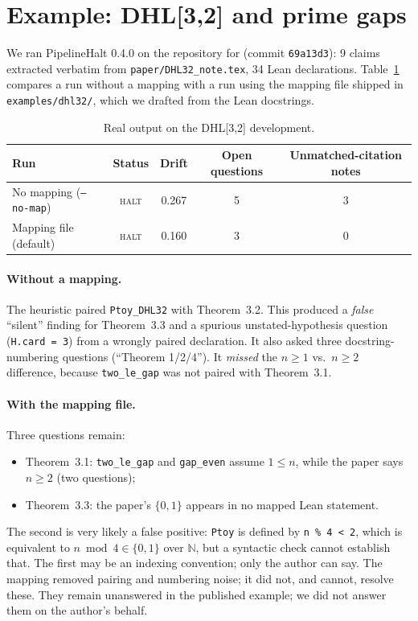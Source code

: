 \documentclass[11pt]{article}
\begin{document}
\section{Example: DHL[3,2] and prime gaps}
We ran PipelineHalt 0.4.0 on the repository for \cite{frohman2026dhl} (commit \texttt{69a13d3}): 9 claims extracted verbatim from \texttt{paper/DHL32\_note.tex}, 34 Lean declarations. Table~\ref{tab:runs} compares a run without a mapping with a run using the mapping file shipped in \texttt{examples/dhl32/}, which we drafted from the Lean docstrings.
\begin{table}[h]\centering\small
\begin{tabular}{lcccc}\toprule
Run & Status & Drift & Open questions & Unmatched-citation notes \\\midrule
No mapping (\texttt{--no-map}) & \textsc{halt} & 0.267 & 5 & 3 \\
Mapping file (default) & \textsc{halt} & 0.160 & 3 & 0 \\\bottomrule
\end{tabular}
\caption{Real output on the DHL[3,2] development.}\label{tab:runs}
\end{table}

\paragraph{Without a mapping.} The heuristic paired \texttt{Ptoy\_DHL32} with Theorem~3.2. This produced a \emph{false} ``silent'' finding for Theorem~3.3 and a spurious unstated-hypothesis question (\texttt{H.card = 3}) from a wrongly paired declaration. It also asked three docstring-numbering questions (``Theorem 1/2/4''). It \emph{missed} the $n\ge1$ vs.\ $n\ge2$ difference, because \texttt{two\_le\_gap} was not paired with Theorem~3.1.

\paragraph{With the mapping file.} Three questions remain:
\begin{itemize}
\item Theorem~3.1: \texttt{two\_le\_gap} and \texttt{gap\_even} assume $1\le n$, while the paper says $n\ge2$ (two questions);
\item Theorem~3.3: the paper's $\{0,1\}$ appears in no mapped Lean statement.
\end{itemize}
The second is very likely a false positive: \texttt{Ptoy} is defined by \texttt{n \% 4 < 2}, which is equivalent to $n \bmod 4\in\{0,1\}$ over $\mathbb{N}$, but a syntactic check cannot establish that. The first may be an indexing convention; only the author can say. The mapping removed pairing and numbering noise; it did not, and cannot, resolve these. They remain unanswered in the published example; we did not answer them on the author's behalf.
\end{document}
